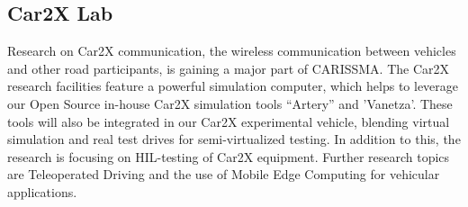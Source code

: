 \subsection{Car2X Lab}

Research on Car2X communication, the wireless communication between vehicles
and other road participants, is gaining a major part of \ac{CARISSMA}. The
Car2X research facilities feature a powerful simulation computer, which helps
to leverage our Open Source in-house Car2X simulation tools “Artery” and
'Vanetza'. These tools will also be integrated in our Car2X experimental
vehicle, blending virtual simulation and real test drives for semi-virtualized
testing. In addition to this, the research is focusing on HIL-testing of Car2X
equipment. Further research topics are Teleoperated Driving and the use of
Mobile Edge Computing for vehicular applications.
